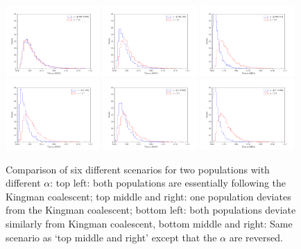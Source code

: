 \documentclass{article}
\begin{document}
\begin{figure}[h]
\includegraphics[width=0.32\textwidth]{simtree-0.999-0.999}
\includegraphics[width=0.32\textwidth]{simtree-0.999-0.9}
\includegraphics[width=0.32\textwidth]{simtree-0.999-0.7}\\
\includegraphics[width=0.32\textwidth]{simtree-0.9-0.9}
\includegraphics[width=0.32\textwidth]{simtree-0.9-0.999}
\includegraphics[width=0.32\textwidth]{simtree-0.7-0.999}
\caption{Comparison of six different scenarios for two populations with different $\alpha$: top left: both populations are essentially following the Kingman coalescent; top middle and right: one population deviates from the Kingman coalescent; bottom left: both populations deviate similarly from Kingman coalescent, bottom middle and right: Same scenario as `top middle and right' except that the $\alpha$ are reversed.}\label{fig2}
\end{figure}
\end{document}
